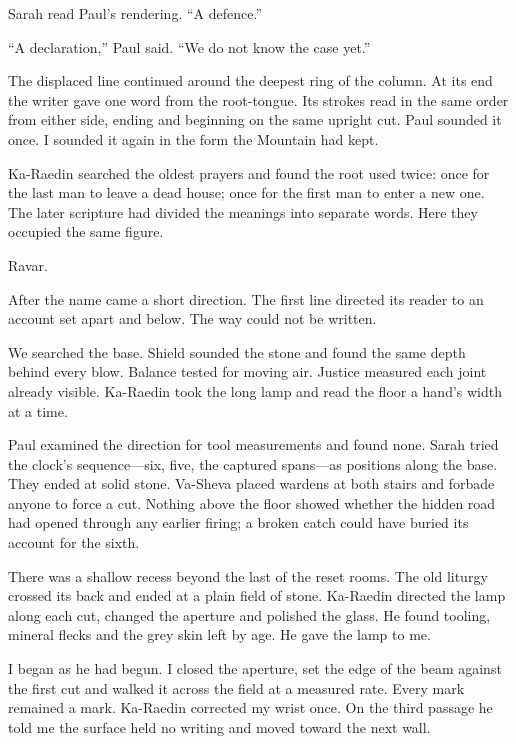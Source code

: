 Sarah read Paul's rendering. ``A defence.''\par

``A declaration,'' Paul said. ``We do not know the case yet.''\par

The displaced line continued around the deepest ring of the column. At its end the writer gave one word from the root-tongue. Its strokes read in the same order from either side, ending and beginning on the same upright cut. Paul sounded it once. I sounded it again in the form the Mountain had kept.\par

Ka-Raedin searched the oldest prayers and found the root used twice: once for the last man to leave a dead house; once for the first man to enter a new one. The later scripture had divided the meanings into separate words. Here they occupied the same figure.\par

Ravar.\par

After the name came a short direction. The first line directed its reader to an account set apart and below. The way could not be written.\par

\ornament

We searched the base. Shield sounded the stone and found the same depth behind every blow. Balance tested for moving air. Justice measured each joint already visible. Ka-Raedin took the long lamp and read the floor a hand's width at a time.\par

Paul examined the direction for tool measurements and found none. Sarah tried the clock's sequence—six, five, the captured spans—as positions along the base. They ended at solid stone. Va-Sheva placed wardens at both stairs and forbade anyone to force a cut. Nothing above the floor showed whether the hidden road had opened through any earlier firing; a broken catch could have buried its account for the sixth.\par

There was a shallow recess beyond the last of the reset rooms. The old liturgy crossed its back and ended at a plain field of stone. Ka-Raedin directed the lamp along each cut, changed the aperture and polished the glass. He found tooling, mineral flecks and the grey skin left by age. He gave the lamp to me.\par

I began as he had begun. I closed the aperture, set the edge of the beam against the first cut and walked it across the field at a measured rate. Every mark remained a mark. Ka-Raedin corrected my wrist once. On the third passage he told me the surface held no writing and moved toward the next wall.\par

